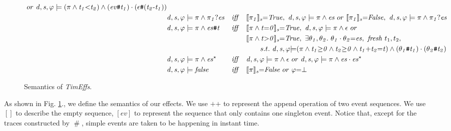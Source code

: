 \documentclass[acmsmall,10pt,review]{acmart}
\newcommand{\es}{\theta}
\newcommand{\ev}{ev}
\newcommand{\timedEffects}{\emph{TimEffs}}
\newcommand{\code}[1]{{\tt{\ensuremath{\m{#1}}}}}
\newcommand{\m}{\mathit}
\newcommand{\lappend}{\mathrel{\texttt{++}}}
\newcommand{\mysharp}{{\mathrel{\texttt{\#}}}}
\newcommand\figref[1]{Fig. \textcolor{black}{\ref{#1}}.}
\begin{document}
{\begin{figure}[!ht]
\begin{align*}
\ or\ \code{d, s, \varphi \models {(\pi \wedge t_1 {<}t_2)}  \wedge (\ev\mysharp t_1) \cdot (\epsilon \mysharp  (t_2\text{-}t_1))  } \\
&\code{d, s, \varphi \models {\pi} \wedge \pi_1 ? es}  &\m{iff}\quad & 
\code{\llbracket \pi_1  \rrbracket_{s} {=}  
 {True} }, \ \code{d, s, \varphi \models {\pi}  \wedge es}\ or  \ 
  \code{\llbracket \pi_1 \rrbracket_{s} {=}  
{False} }, 
\  \code{d, s, \varphi \models {\pi} \wedge \pi_1 ? es}\\
&\code{d, s, \varphi \models {\pi}  \wedge es\mysharp  t}  &\m{iff}\quad &
 \code{\llbracket {\pi}  \wedge t {=} 0 \rrbracket_{s} {=}  
 {True} }, \ \code{d, s, \varphi \models {\pi}  \wedge  \epsilon}\ or  \\
& & &  \code{\llbracket {\pi}\wedge t {>} 0 \rrbracket_{s} {=}  
{True} }, 
\  \exists \code{\es_1,\es_2}. \  \code{\es_1  \cdot  \es_2 {=} es}, \  \m{fresh}\ t_1, t_2,\\
&&& \qquad  s.t. \ \code{d, s, \varphi {\models} {(\pi 
 \wedge  t_1{\geq}0 \wedge t_2{\geq}0  \wedge  t_1{+} t_2{=}t)} \wedge 
(\es_1\mysharp t_1)  \cdot  (\es_2\mysharp t_2) } \\
&\code{d, s, \varphi \models {\pi}\wedge es^\star}  &\m{iff}\quad & 
\code{d, s, \varphi \models {\pi}  \wedge  \epsilon}\ or \ 
\code{d, s, \varphi \models {\pi}  \wedge es  \cdot  es^\star}\\
& \code{d, s, \varphi \models false}  &\m{iff}\quad &
 \code{\llbracket {\pi}  \rrbracket_{s} {=} {False} } \ or \ \code{\varphi {=} \bot }
\end{align*}
\caption{Semantics of \timedEffects.}
\label{fig:Sementic}
\end{figure}


As shown in \figref{fig:Sementic}, we define the semantics of our effects. 
We use $\lappend$ to represent the append operation of two event sequences. 
We use $[]$ to describe the empty sequence, \code{[\ev]} to represent 
the sequence that only contains one singleton event. 
Notice that, except for the traces constructed by \code{\mysharp}, simple events 
are taken to be happening in instant time. 


}
\end{document}
